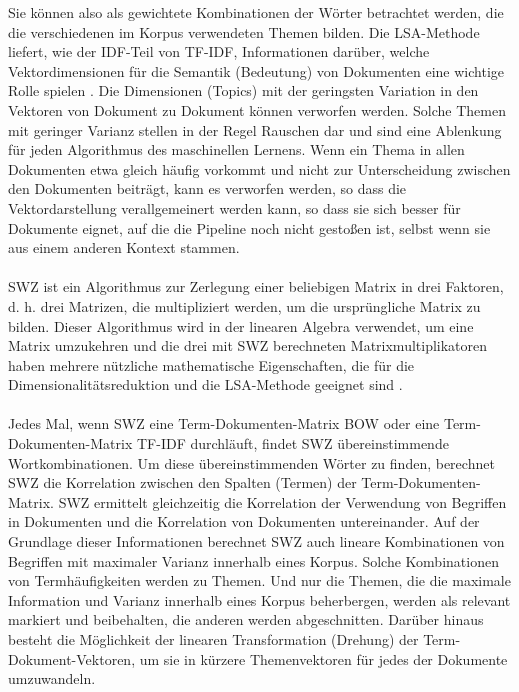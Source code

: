 Sie können also als gewichtete Kombinationen der Wörter betrachtet werden, die die verschiedenen im Korpus verwendeten Themen bilden.  
Die \ac{LSA}-Methode liefert, wie der \ac{IDF}-Teil von \ac{TF-IDF}, Informationen darüber, welche Vektordimensionen für die Semantik (Bedeutung) von Dokumenten eine wichtige Rolle spielen \cite{dumais_using_1988}.
Die Dimensionen (Topics) mit der geringsten Variation in den Vektoren von Dokument zu Dokument können verworfen werden. 
Solche Themen mit geringer Varianz stellen in der Regel Rauschen dar und sind eine Ablenkung für jeden Algorithmus des maschinellen Lernens. 
Wenn ein Thema in allen Dokumenten etwa gleich häufig vorkommt und nicht zur Unterscheidung zwischen den Dokumenten beiträgt, kann es verworfen werden, so dass die Vektordarstellung verallgemeinert werden kann, so dass sie sich besser für Dokumente eignet, auf die die Pipeline noch nicht gestoßen ist, selbst wenn sie aus einem anderen Kontext stammen.\\\\
\ac{SWZ} ist ein Algorithmus zur Zerlegung einer beliebigen Matrix in drei Faktoren, d. h. drei Matrizen, die multipliziert werden, um die ursprüngliche Matrix zu bilden. 
Dieser Algorithmus wird in der linearen Algebra verwendet, um eine Matrix umzukehren und die drei mit \ac{SWZ} berechneten Matrixmultiplikatoren haben mehrere nützliche mathematische Eigenschaften, die für die Dimensionalitätsreduktion und die \ac{LSA}-Methode geeignet sind \cite{eckart_approximation_1936}.\\\\
Jedes Mal, wenn \ac{SWZ} eine Term-Dokumenten-Matrix \ac{BOW} oder eine Term-Dokumenten-Matrix \ac{TF-IDF} durchläuft, findet \ac{SWZ} übereinstimmende Wortkombinationen. 
Um diese übereinstimmenden Wörter zu finden, berechnet \ac{SWZ} die Korrelation zwischen den Spalten (Termen) der Term-Dokumenten-Matrix. 
\ac{SWZ} ermittelt gleichzeitig die Korrelation der Verwendung von Begriffen in Dokumenten und die Korrelation von Dokumenten untereinander. 
Auf der Grundlage dieser Informationen berechnet \ac{SWZ} auch lineare Kombinationen von Begriffen mit maximaler Varianz innerhalb eines Korpus. 
Solche Kombinationen von Termhäufigkeiten werden zu Themen. 
Und nur die Themen, die die maximale Information und Varianz innerhalb eines Korpus beherbergen, werden als relevant markiert und beibehalten, die anderen werden abgeschnitten. 
Darüber hinaus besteht die Möglichkeit der linearen Transformation (Drehung) der Term-Dokument-Vektoren, um sie in kürzere Themenvektoren für jedes der Dokumente umzuwandeln. \cite{wong_generalized_1985}\\\\
